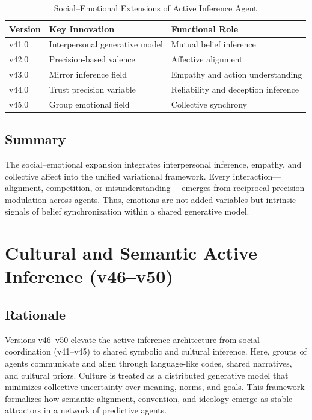 \documentclass[9pt]{elife}
\begin{document}
\begin{table}[h]
\centering
\caption{Social–Emotional Extensions of Active Inference Agent}
\begin{tabular}{l l l}
\hline
Version & Key Innovation & Functional Role \\
\hline
v41.0 & Interpersonal generative model & Mutual belief inference \\
v42.0 & Precision-based valence & Affective alignment \\
v43.0 & Mirror inference field & Empathy and action understanding \\
v44.0 & Trust precision variable & Reliability and deception inference \\
v45.0 & Group emotional field & Collective synchrony \\
\hline
\end{tabular}
\end{table}

\subsection{Summary}

The social–emotional expansion integrates interpersonal inference,
empathy, and collective affect into the unified variational framework.
Every interaction—alignment, competition, or misunderstanding—
emerges from reciprocal precision modulation across agents.
Thus, emotions are not added variables but intrinsic signals of
belief synchronization within a shared generative model.


\section{Cultural and Semantic Active Inference (v46–v50)}

\subsection{Rationale}

Versions v46–v50 elevate the active inference architecture
from social coordination (v41–v45) to shared symbolic
and cultural inference.
Here, groups of agents communicate and align through
language-like codes, shared narratives, and cultural priors.
Culture is treated as a distributed generative model that
minimizes collective uncertainty over meaning, norms, and goals.
This framework formalizes how semantic alignment, convention,
and ideology emerge as stable attractors in a network
of predictive agents.
\end{document}
